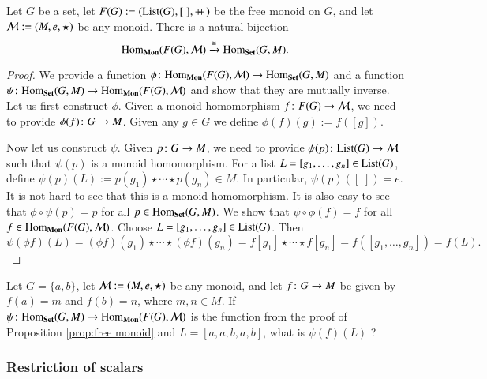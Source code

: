\begin{proposition}\label{prop:free monoid}

Let $G$ be a set, let $F(G):=(\List(G),[\;],\plpl)$ be the free monoid on $G$, and let $\mathcal{M}:=(M,e,\star)$ be any monoid. There is a natural bijection
$$\Hom_\Mon(F(G),\mcM)\To{\iso}\Hom_\Set(G,M).$$

\end{proposition}

\begin{proof}

We provide a function $\phi\taking\Hom_\Mon(F(G),\mcM)\to\Hom_\Set(G,M)$ and a function $\psi\taking\Hom_\Set(G,M)\to\Hom_\Mon(F(G),\mcM)$ and show that they are mutually inverse. Let us first construct $\phi$. Given a monoid homomorphism $f\colon F(G)\rightarrow\mathcal{M}$, we need to provide $\phi(f)\colon G\rightarrow M$. Given any $g\in G$ we define $\phi(f)(g):=f([g]).$ 

Now let us construct $\psi$. Given $p\colon G\rightarrow M$, we need to provide $\psi(p)\taking\List(G)\to\mcM$ such that $\psi(p)$ is a monoid homomorphism. For a list $L=[g_1,\ldots,g_n]\in\List(G)$, define $\psi(p)(L):=p(g_1)\star\cdots\star p(g_n)\in M$. In particular, $\psi(p)([\;])=e$. It is not hard to see that this is a monoid homomorphism. It is also easy to see that $\phi\circ\psi(p)=p$ for all $p\in\Hom_\Set(G,M)$. We show that $\psi\circ\phi(f)=f$ for all $f\in\Hom_\Mon(F(G),\mcM)$. Choose $L=[g_1,\ldots,g_n]\in\List(G)$. Then 
$$\psi(\phi f)(L)=(\phi f)(g_1)\star\cdots\star(\phi f)(g_n)=f[g_1]\star\cdots\star f[g_n]=f([g_1,\ldots,g_n])=f(L).$$

\end{proof}

\begin{exercise}
Let $G=\{a,b\}$, let $\mathcal{M}:=(M,e,\star)$ be any monoid, and let $f\colon G\rightarrow M$ be given by $f(a)=m$ and $f(b)=n$, where $m,n\in M$. If $\psi\taking\Hom_\Set(G,M)\to\Hom_\Mon(F(G),\mcM)$ is the function from the proof of Proposition \ref{prop:free monoid} and $L=[a,a,b,a,b]$, what is $\psi(f)(L)$ ?
\end{exercise}


\subsubsection{Restriction of scalars}

